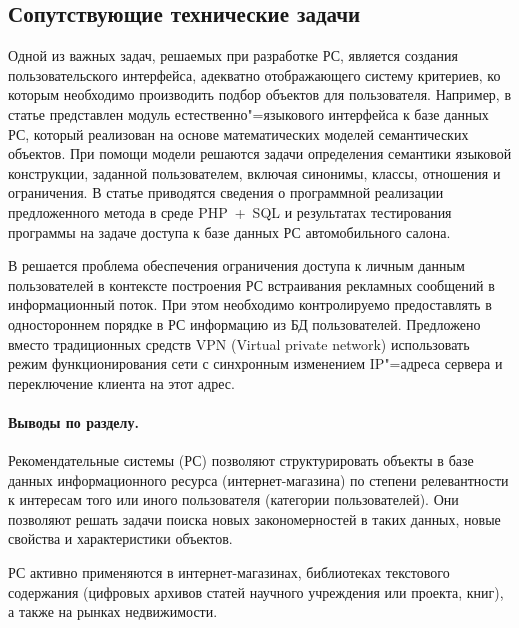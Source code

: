 \documentclass[a4paper,14pt,openany,final]{extreport} %
\begin{document}
\subsection{Сопутствующие технические задачи}
\label{sec:co-tasks}

Одной из важных задач, решаемых при разработке РС, является создания пользовательского интерфейса, адекватно отображающего систему критериев, ко которым необходимо производить подбор объектов для пользователя. Например, в статье \cite{b14} представлен модуль естественно"=языкового интерфейса к базе данных РС, который реализован на основе математических моделей семантических объектов. При помощи модели решаются задачи определения семантики языковой конструкции, заданной пользователем, включая синонимы, классы, отношения и ограничения. В статье приводятся сведения о программной реализации предложенного метода в среде PHP~+~SQL и результатах тестирования программы на задаче доступа к базе данных РС автомобильного салона.

В \cite{b15} решается проблема обеспечения ограничения доступа к личным данным пользователей в контексте построения РС встраивания рекламных сообщений в информационный поток. При этом необходимо контролируемо предоставлять в одностороннем порядке в РС информацию из БД пользователей. Предложено вместо традиционных средств VPN (\foreignlanguage{english}{Virtual private network}) использовать режим функционирования сети с синхронным изменением IP"=адреса сервера и переключение клиента на этот адрес.

\paragraph{Выводы по разделу.}

Рекомендательные системы (РС) позволяют структурировать объекты в базе данных информационного ресурса (интернет-магазина) по степени релевантности к интересам того или иного пользователя (категории пользователей). Они позволяют решать задачи поиска новых закономерностей в таких данных, новые свойства и характеристики объектов.

РС активно применяются в интернет-магазинах, библиотеках текстового содержания (цифровых архивов статей научного учреждения или проекта, книг), а также на рынках недвижимости.
\end{document}

